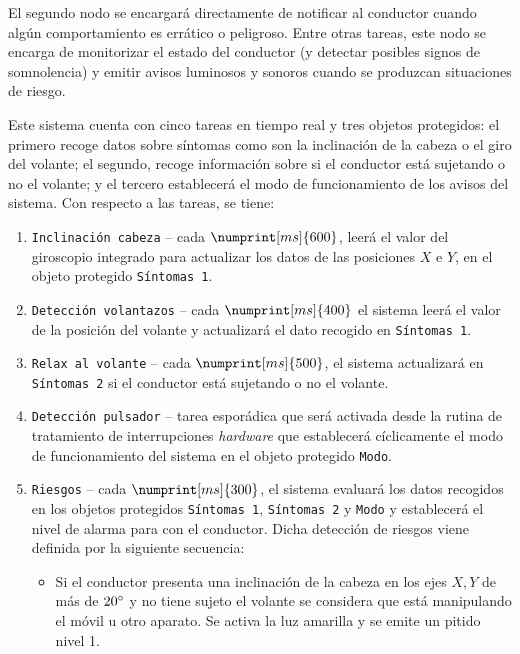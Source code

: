 El segundo nodo se encargará directamente de notificar al conductor cuando algún
comportamiento es errático o peligroso. Entre otras tareas, este nodo se encarga
de monitorizar el estado del conductor (y detectar posibles signos de somnolencia)
y emitir avisos luminosos y sonoros cuando se produzcan situaciones de riesgo.

Este sistema cuenta con cinco tareas en tiempo real y tres objetos protegidos: el
primero recoge datos sobre síntomas como son la inclinación de la cabeza o el
giro del volante; el segundo, recoge información sobre si el conductor está
sujetando o no el volante; y el tercero establecerá el modo de funcionamiento de
los avisos del sistema. Con respecto a las tareas, se tiene:

\begin{enumerate}
  \item \texttt{Inclinación cabeza} -- cada $\numprint[ms]{600}$, leerá el valor del
        giroscopio integrado para actualizar los datos de las posiciones $X$ e $Y$,
        en el objeto protegido \texttt{Síntomas 1}.
  \item \texttt{Detección volantazos} -- cada $\numprint[ms]{400}$ el sistema leerá
        el valor de la posición del volante y actualizará el dato recogido en 
        \texttt{Síntomas 1}.
  \item \texttt{Relax al volante} -- cada $\numprint[ms]{500}$, el sistema actualizará
        en \texttt{Síntomas 2} si el conductor está sujetando o no el volante.
  \item \texttt{Detección pulsador} -- tarea esporádica que será activada desde la rutina
        de tratamiento de interrupciones \textit{hardware} que establecerá cíclicamente
        el modo de funcionamiento del sistema en el objeto protegido \texttt{Modo}.
  \item \texttt{Riesgos} -- cada $\numprint[ms]{300}$, el sistema evaluará los datos
        recogidos en los objetos protegidos \texttt{Síntomas 1}, \texttt{Síntomas 2} y \texttt{Modo} y 
        establecerá el nivel de alarma para con el conductor. Dicha detección de riesgos
        viene definida por la siguiente secuencia:
        \begin{itemize}
          \item Si el conductor presenta una inclinación de la cabeza en los ejes $X, Y$
                de más de $20\degree$ y no tiene sujeto el volante se considera que está
                manipulando el móvil u otro aparato. Se activa la luz amarilla y se
                emite un pitido nivel 1.

\end{itemize}
\end{enumerate}
